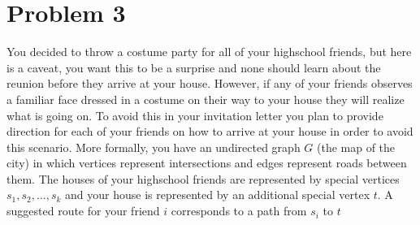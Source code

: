 \documentclass{article}
\begin{document}
\section*{Problem 3}
You decided to throw a costume party for all of your highschool friends, but here is a caveat, you want this to be a surprise and none should learn about the reunion before they arrive at your house.
However, if any of your friends observes a familiar face dressed in a costume on their way to your house they will realize what is going on.
To avoid this in your invitation letter you plan to provide direction for each of your friends on how to arrive at your house in order to avoid this scenario.
\newline
\indent More formally, you have an undirected graph $G$ (the map of the city) in which vertices represent intersections and edges represent roads between them.
The houses of your highschool friends are represented by special vertices $s_1,s_2, ..., s_k$ and your house is represented by an additional special vertex $t$. A suggested route for your friend $i$ corresponds to a path from $s_i$ to $t$
\newline
\end{document}
